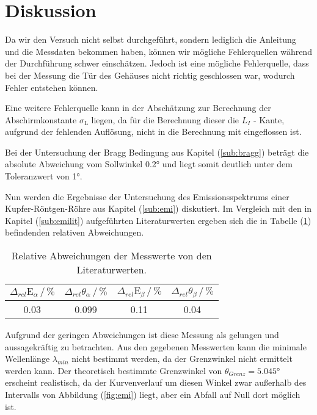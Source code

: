 \newpage
\section{Diskussion}
Da wir den Versuch nicht selbst durchgeführt, sondern lediglich die Anleitung und die Messdaten bekommen haben, können wir mögliche Fehlerquellen während der Durchführung schwer einschätzen. 
Jedoch ist eine mögliche Fehlerquelle, dass bei der Messung die Tür des Gehäuses nicht richtig geschlossen war, wodurch Fehler entstehen können.

\noindent
Eine weitere Fehlerquelle kann in der Abschätzung zur Berechnung der Abschirmkonstante $\sigma_\text{L}$ liegen, da für die Berechnung dieser die $L_I$ - Kante, aufgrund der fehlenden 
Auflösung, nicht in die Berechnung mit eingeflossen ist.

\noindent
Bei der Untersuchung der Bragg Bedingung aus Kapitel (\ref{sub:bragg}) beträgt die absolute Abweichung vom Sollwinkel 0.2° und liegt somit deutlich unter dem Toleranzwert von 1°.

\noindent
Nun werden die Ergebnisse der Untersuchung des Emissionsspektrums einer Kupfer-Röntgen-Röhre aus Kapitel (\ref{sub:emi}) diskutiert.
Im Vergleich mit den in Kapitel (\ref{sub:emilit}) aufgeführten Literaturwerten ergeben sich die in Tabelle (\ref{tab:diskemi}) befindenden relativen Abweichungen.

\begin{table}
    \centering
    \caption{Relative Abweichungen der Messwerte von den Literaturwerten.}
    \begin{tabular}{c c c c}
    \toprule
    $\Delta_{rel}\text{E}_\alpha \,/\, \%$ & $\Delta_{rel}\theta_\alpha \,/\, \% $ & $\Delta_{rel}\text{E}_\beta \,/\, \%$ &$\Delta_{rel}\theta_\beta \,/\, \% $\\
    \midrule 
    0.03& 0.099& 0.11& 0.04 \\
    \bottomrule
    \end{tabular}
    \label{tab:diskemi}
    \end{table}

\noindent
Aufgrund der geringen Abweichungen ist diese Messung als gelungen und aussagekräftig zu betrachten.
Aus den gegebenen Messwerten kann die minimale Wellenlänge $\lambda_{min}$ nicht bestimmt werden,
da der Grenzwinkel nicht ermittelt werden kann.
Der theoretisch bestimmte Grenzwinkel von $\theta_{Grenz} = 5.045°$ erscheint realistisch, da der Kurvenverlauf um diesen Winkel zwar außerhalb des Intervalls von Abbildung (\ref{fig:emi}) liegt,
aber ein Abfall auf Null dort möglich ist.

